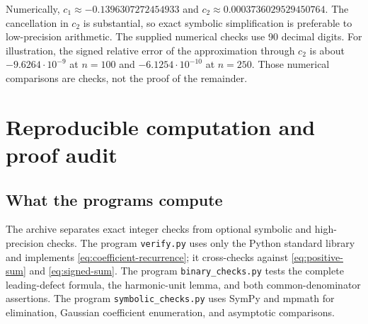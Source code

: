 \documentclass[11pt,a4paper]{article}
\numberwithin{equation}{section}
\theoremstyle{definition}
\theoremstyle{remark}
\begin{document}
Numerically, $c_1\approx-0.1396307272454933$ and
$c_2\approx0.0003736029529450764$. The cancellation in $c_2$ is substantial,
so exact symbolic simplification is preferable to low-precision arithmetic.
The supplied numerical checks use 90 decimal digits. For illustration,
the signed relative error of the approximation through $c_2$ is about
$-9.6264\cdot10^{-9}$ at $n=100$ and $-6.1254\cdot10^{-10}$ at $n=250$.
Those numerical comparisons are checks, not the proof of the remainder.

\section{Reproducible computation and proof audit}
\label{sec:verification}

\subsection{What the programs compute}
The archive separates exact integer checks from optional symbolic and
high-precision checks. The program \texttt{verify.py} uses only the Python
standard library and implements \eqref{eq:coefficient-recurrence}; it
cross-checks against \eqref{eq:positive-sum} and \eqref{eq:signed-sum}.
The program \texttt{binary\_checks.py} tests the complete leading-defect
formula, the harmonic-unit lemma, and both common-denominator assertions.
The program \texttt{symbolic\_checks.py} uses SymPy and mpmath for
elimination, Gaussian coefficient enumeration, and asymptotic comparisons.
\end{document}
